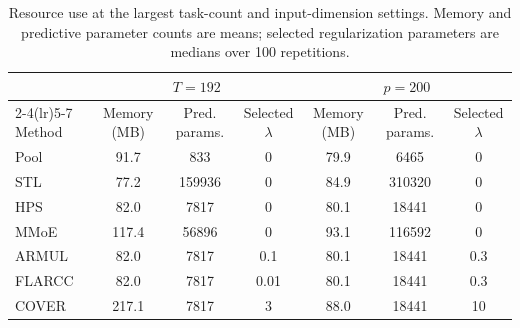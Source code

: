 \begin{table}[H]
\centering
\scriptsize
\setlength{\tabcolsep}{4pt}
\begin{tabular}{lcccccc}
\toprule
& \multicolumn{3}{c}{\(T=192\)} & \multicolumn{3}{c}{\(p=200\)} \\
\cmidrule(lr){2-4}\cmidrule(lr){5-7}
Method & Memory (MB) & Pred. params. & Selected \(\lambda\) & Memory (MB) & Pred. params. & Selected \(\lambda\) \\
\midrule
Pool & 91.7 & 833 & 0 & 79.9 & 6465 & 0 \\
STL & 77.2 & 159936 & 0 & 84.9 & 310320 & 0 \\
HPS & 82.0 & 7817 & 0 & 80.1 & 18441 & 0 \\
MMoE & 117.4 & 56896 & 0 & 93.1 & 116592 & 0 \\
ARMUL & 82.0 & 7817 & 0.1 & 80.1 & 18441 & 0.3 \\
FLARCC & 82.0 & 7817 & 0.01 & 80.1 & 18441 & 0.3 \\
COVER & 217.1 & 7817 & 3 & 88.0 & 18441 & 10 \\
\bottomrule
\end{tabular}
\caption{Resource use at the largest task-count and input-dimension settings. Memory and predictive parameter counts are means; selected regularization parameters are medians over 100 repetitions.}
\label{tab:scaling-resources}
\end{table}
